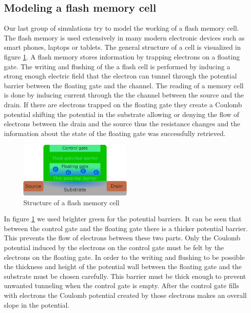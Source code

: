 \subsection{Modeling a flash memory cell}

Our last group of simulations try to model the working of a flash memory cell.
The flash memory is used extensively in many modern electronic devices such as smart phones, laptops or tablets.
The general structure of a cell is visualized in figure \ref{fig:flash_memory}.
A flash memory stores information by trapping electrons on a floating gate.
The writing and flushing of the a flash cell is performed by inducing a strong enough electric field that the electron can tunnel through the potential barrier between the floating gate and the channel.
The reading of a memory cell is done by inducing current through the the channel between the source and the drain.
If there are electrons trapped on the floating gate they create a Coulomb potential shifting the potential in the substrate allowing or denying the flow of electrons between the drain and the source thus the resistance changes and the information about the state of the floating gate was successfully retrieved.
\begin{figure}
	\centering
	\includegraphics[width=0.5\textwidth]{figures/flash_memory.pdf}
	\caption{Structure of a flash memory cell}
	\label{fig:flash_memory}
\end{figure}
In figure \ref{fig:flash_memory} we used brighter green for the potential barriers.
It can be seen that between the control gate and the floating gate there is a thicker potential barrier.
This prevents the flow of electrons between these two parts.
Only the Coulomb potential induced by the electrons on the control gate must be felt by the electrons on the floating gate.
In order to the writing and flushing to be possible the thickness and height of the potential wall between the floating gate and the substrate must be chosen carefully.
This barrier must be thick enough to prevent unwanted tunneling when the control gate is empty.
After the control gate fills with electrons the Coulomb potential created by those electrons makes an overall slope in the potential.

